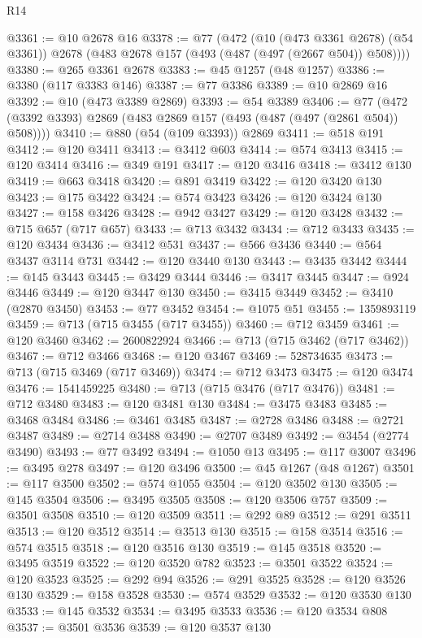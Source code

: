 \begin{lexlean}{R14}
\begin{coremodule}
@3361 := @10 @2678 @16
@3378 := @77
    (@472
      (@10 (@473 @3361 @2678) (@54 @3361))
      @2678
      (@483 @2678 @157 (@493 (@487 (@497 (@2667 @504)) @508))))
@3380 := @265 @3361 @2678
@3383 := @45 @1257 (@48 @1257)
@3386 := @3380 (@117 @3383 @146)
@3387 := @77 @3386
@3389 := @10 @2869 @16
@3392 := @10 (@473 @3389 @2869)
@3393 := @54 @3389
@3406 := @77 (@472 (@3392 @3393) @2869 (@483 @2869 @157 (@493 (@487 (@497 (@2861 @504)) @508))))
@3410 := @880 (@54 (@109 @3393)) @2869
@3411 := @518 @191
@3412 := @120 @3411
@3413 := @3412 @603
@3414 := @574 @3413
@3415 := @120 @3414
@3416 := @349 @191
@3417 := @120 @3416
@3418 := @3412 @130
@3419 := @663 @3418
@3420 := @891 @3419
@3422 := @120 @3420 @130
@3423 := @175 @3422
@3424 := @574 @3423
@3426 := @120 @3424 @130
@3427 := @158 @3426
@3428 := @942 @3427
@3429 := @120 @3428
@3432 := @715 @657 (@717 @657)
@3433 := @713 @3432
@3434 := @712 @3433
@3435 := @120 @3434
@3436 := @3412 @531
@3437 := @566 @3436
@3440 := @564 @3437 @3114 @731
@3442 := @120 @3440 @130
@3443 := @3435 @3442
@3444 := @145 @3443
@3445 := @3429 @3444
@3446 := @3417 @3445
@3447 := @924 @3446
@3449 := @120 @3447 @130
@3450 := @3415 @3449
@3452 := @3410 (@2870 @3450)
@3453 := @77 @3452
@3454 := @1075 @51
@3455 := 1359893119
@3459 := @713 (@715 @3455 (@717 @3455))
@3460 := @712 @3459
@3461 := @120 @3460
@3462 := 2600822924
@3466 := @713 (@715 @3462 (@717 @3462))
@3467 := @712 @3466
@3468 := @120 @3467
@3469 := 528734635
@3473 := @713 (@715 @3469 (@717 @3469))
@3474 := @712 @3473
@3475 := @120 @3474
@3476 := 1541459225
@3480 := @713 (@715 @3476 (@717 @3476))
@3481 := @712 @3480
@3483 := @120 @3481 @130
@3484 := @3475 @3483
@3485 := @3468 @3484
@3486 := @3461 @3485
@3487 := @2728 @3486
@3488 := @2721 @3487
@3489 := @2714 @3488
@3490 := @2707 @3489
@3492 := @3454 (@2774 @3490)
@3493 := @77 @3492
@3494 := @1050 @13
@3495 := @117 @3007
@3496 := @3495 @278
@3497 := @120 @3496
@3500 := @45 @1267 (@48 @1267)
@3501 := @117 @3500
@3502 := @574 @1055
@3504 := @120 @3502 @130
@3505 := @145 @3504
@3506 := @3495 @3505
@3508 := @120 @3506 @757
@3509 := @3501 @3508
@3510 := @120 @3509
@3511 := @292 @89
@3512 := @291 @3511
@3513 := @120 @3512
@3514 := @3513 @130
@3515 := @158 @3514
@3516 := @574 @3515
@3518 := @120 @3516 @130
@3519 := @145 @3518
@3520 := @3495 @3519
@3522 := @120 @3520 @782
@3523 := @3501 @3522
@3524 := @120 @3523
@3525 := @292 @94
@3526 := @291 @3525
@3528 := @120 @3526 @130
@3529 := @158 @3528
@3530 := @574 @3529
@3532 := @120 @3530 @130
@3533 := @145 @3532
@3534 := @3495 @3533
@3536 := @120 @3534 @808
@3537 := @3501 @3536
@3539 := @120 @3537 @130

\end{coremodule}
\end{lexlean}
